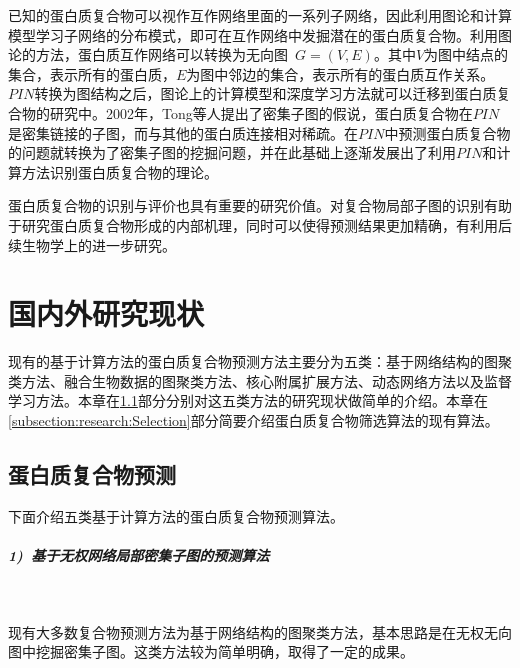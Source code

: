 已知的蛋白质复合物可以视作互作网络里面的一系列子网络，因此利用图论和计算模型学习子网络的分布模式，即可在互作网络中发掘潜在的蛋白质复合物\cite{legrain_proteinprotein_2001}。利用图论的方法，蛋白质互作网络可以转换为无向图~$G=(V,E)$。其中$V$为图中结点的集合，表示所有的蛋白质，$E$为图中邻边的集合，表示所有的蛋白质互作关系。$PIN$转换为图结构之后，图论上的计算模型和深度学习方法就可以迁移到蛋白质复合物的研究中。2002年，Tong\cite{tong_combined_2002}等人提出了密集子图的假说，蛋白质复合物在$PIN$是密集链接的子图，而与其他的蛋白质连接相对稀疏。在$PIN$中预测蛋白质复合物的问题就转换为了密集子图的挖掘问题，并在此基础上逐渐发展出了利用$PIN$和计算方法识别蛋白质复合物的理论。

蛋白质复合物的识别与评价也具有重要的研究价值。对复合物局部子图的识别有助于研究蛋白质复合物形成的内部机理，同时可以使得预测结果更加精确，有利用后续生物学上的进一步研究。

\section{国内外研究现状}
\label{section:intro:research}

现有的基于计算方法的蛋白质复合物预测方法主要分为五类：基于网络结构的图聚类方法、融合生物数据的图聚类方法、核心附属扩展方法、动态网络方法以及监督学习方法。本章在\ref{subsection:research:Prediction}部分分别对这五类方法的研究现状做简单的介绍。本章在\ref{subsection:research:Selection}部分简要介绍蛋白质复合物筛选算法的现有算法。

\subsection{蛋白质复合物预测}
\label{subsection:research:Prediction}

下面介绍五类基于计算方法的蛋白质复合物预测算法。

\subparagraph*{1)~基于无权网络局部密集子图的预测算法} ~

现有大多数复合物预测方法为基于网络结构的图聚类方法，基本思路是在无权无向图中挖掘密集子图。这类方法较为简单明确，取得了一定的成果。

